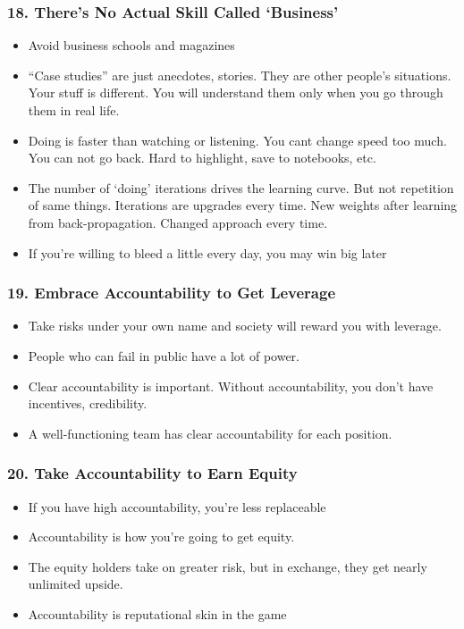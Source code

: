 \begin{frame}[fragile]
\frametitle{18. There's No Actual Skill Called `Business'}
\begin{itemize}
\item Avoid business schools and magazines
\item ``Case studies'' are just anecdotes, stories. They are other people's situations. Your stuff is different. You will understand them only when you go through them in real life.
\item Doing is faster than watching or listening. You cant change speed too much. You can not go back. Hard to highlight, save to notebooks, etc.
\item The number of `doing' iterations drives the learning curve. But not repetition of same things. Iterations are upgrades every time. New weights after learning from back-propagation. Changed approach every time.
\item If you're willing to bleed a little every day, you may win big later
\end{itemize}
\end{frame}


\begin{frame}[fragile]
\frametitle{19. Embrace Accountability to Get Leverage}
\begin{itemize}
\item Take risks under your own name and society will reward you with leverage.
\item People who can fail in public have a lot of power.
\item Clear accountability is important. Without accountability, you don't have incentives, credibility.
\item A well-functioning team has clear accountability for each position.
\end{itemize}
\end{frame}


\begin{frame}[fragile]
\frametitle{20. Take Accountability to Earn Equity}
\begin{itemize}
\item If you have high accountability, you're less replaceable
\item Accountability is how you're going to get equity.
\item The equity holders take on greater risk, but in exchange, they get nearly unlimited upside.
\item Accountability is reputational skin in the game
\end{itemize}
\end{frame}

